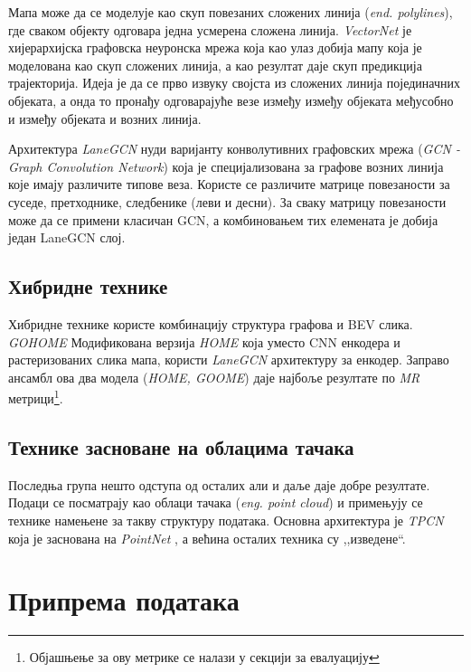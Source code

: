 \documentclass[11pt,oneside]{memoir}
\begin{document}
Мапа може да се моделује као скуп повезаних сложених линија (\textit{end. polylines}), где сваком објекту одговара једна усмерена сложена линија. 
\textit{VectorNet} је хијерархијска графовска неуронска мрежа која као улаз добија мапу која је моделована као скуп 
сложених линија, а као резултат даје скуп предикција трајекторија. Идеја је да се прво извуку својста из сложених 
линија појединачних објеката, а онда то пронађу одговарајуће везе између између објеката међусобно и између објеката и возних линија. \cite{vectornet} 

Архитектура \textit{LaneGCN} нуди варијанту конволутивних графовских мрежа (\textit{GCN - Graph Convolution Network}) 
која је специјализована за графове возних линија које имају различите типове веза. Користе се различите матрице
повезаности за суседе, претходнике, следбенике (леви и десни). За сваку матрицу повезаности може да се примени класичан GCN, а
комбиновањем тих елемената је добија један LaneGCN слој. \cite{lanegcn} 

\section{Хибридне технике}

Хибридне технике користе комбинацију структура графова и BEV слика. \textit{GOHOME} Модификована верзија \textit{HOME} која уместо
CNN енкодера и растеризованих слика мапа, користи \textit{LaneGCN} архитектуру за енкодер. Заправо ансамбл ова два модела (\textit{HOME, GOOME})
даје најбоље резултате по \textit{MR} метрици\footnote{Објашњење за ову метрике се налази у секцији за евалуацију}.

\section{Технике засноване на облацима тачака}

Последња група нешто одступа од осталих али и даље даје добре резултате. Подаци се посматрају као облаци тачака (\textit{eng. point cloud}) 
и примењују се технике намењене за такву структуру података. Основна
архитектура је \textit{TPCN} \cite{tpcn} која је заснована на \textit{PointNet} \cite{pointnet}, а већина осталих техника су ,,изведене``.

\chapter{Припрема података}
\end{document}
